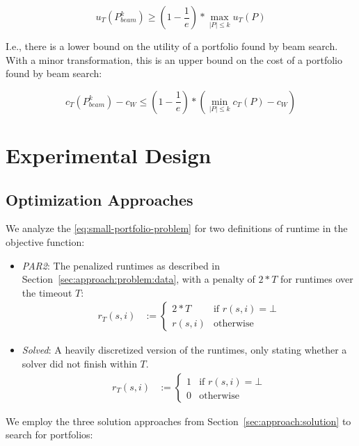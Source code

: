 \documentclass[conference]{IEEEtran}
\begin{document}
\begin{equation}
	u_{T}(P_{beam}^k) \geq (1 - \frac{1}{e}) * \max_{|P| \leq k}{u_{T}(P)}
\end{equation}

I.e., there is a lower bound on the utility of a portfolio found by beam search.
With a minor transformation, this is an upper bound on the cost of a portfolio found by beam search:

\begin{equation}
	c_{T}(P_{beam}^k) - c_W \leq (1 - \frac{1}{e}) * (\min_{|P| \leq k}{c_{T}(P)} - c_W)
\end{equation}

\section{Experimental Design}
\label{sec:experimental-design}

\subsection{Optimization Approaches}

We analyze the \ref{eq:small-portfolio-problem} for two definitions of runtime in the objective function:

\begin{itemize}
	\item \emph{PAR2}:
	The penalized runtimes as described in Section~\ref{sec:approach:problem:data}, with a penalty of $2*T$ for runtimes over the timeout $T$:
	\begin{align*}
		r_T(s,i) &:= \begin{cases}
			2*T & \text{if }r(s,i) = \bot\\
			r(s,i) & \text{otherwise}
		\end{cases}
	\end{align*}
	\item \emph{Solved}:
	A heavily discretized version of the runtimes, only stating whether a solver did not finish within $T$.
	\begin{align*}
		r_T(s,i) &:= \begin{cases}
			1 & \text{if }r(s,i) = \bot\\
			0 & \text{otherwise}
		\end{cases}
	\end{align*}
\end{itemize}

We employ the three solution approaches from Section~\ref{sec:approach:solution} to search for portfolios:
\end{document}
